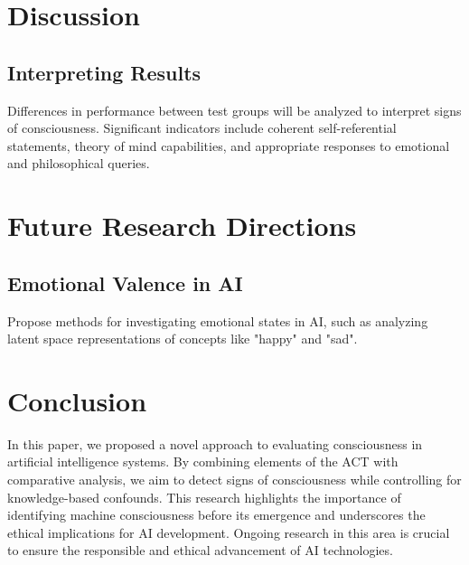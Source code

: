 \documentclass{article}
\begin{document}
\section{Discussion}
\subsection{Interpreting Results}
Differences in performance between test groups will be analyzed to interpret signs of consciousness. Significant indicators include coherent self-referential statements, theory of mind capabilities, and appropriate responses to emotional and philosophical queries.

\section{Future Research Directions}
\subsection{Emotional Valence in AI}
Propose methods for investigating emotional states in AI, such as analyzing latent space representations of concepts like "happy" and "sad".

\section{Conclusion}
In this paper, we proposed a novel approach to evaluating consciousness in artificial intelligence systems. By combining elements of the ACT with comparative analysis, we aim to detect signs of consciousness while controlling for knowledge-based confounds. This research highlights the importance of identifying machine consciousness before its emergence and underscores the ethical implications for AI development. Ongoing research in this area is crucial to ensure the responsible and ethical advancement of AI technologies.
\end{document}
